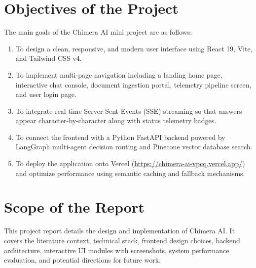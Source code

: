 \section{Objectives of the Project}
The main goals of the Chimera AI mini project are as follows:
\begin{enumerate}
    \item To design a clean, responsive, and modern user interface using React 19, Vite, and Tailwind CSS v4.
    \item To implement multi-page navigation including a landing home page, interactive chat console, document ingestion portal, telemetry pipeline screen, and user login page.
    \item To integrate real-time Server-Sent Events (SSE) streaming so that answers appear character-by-character along with status telemetry badges.
    \item To connect the frontend with a Python FastAPI backend powered by LangGraph multi-agent decision routing and Pinecone vector database search.
    \item To deploy the application onto Vercel (\url{https://chimera-ai-vpcq.vercel.app/}) and optimize performance using semantic caching and fallback mechanisms.
\end{enumerate}

\section{Scope of the Report}
This project report details the design and implementation of Chimera AI. It covers the literature context, technical stack, frontend design choices, backend architecture, interactive UI modules with screenshots, system performance evaluation, and potential directions for future work.
